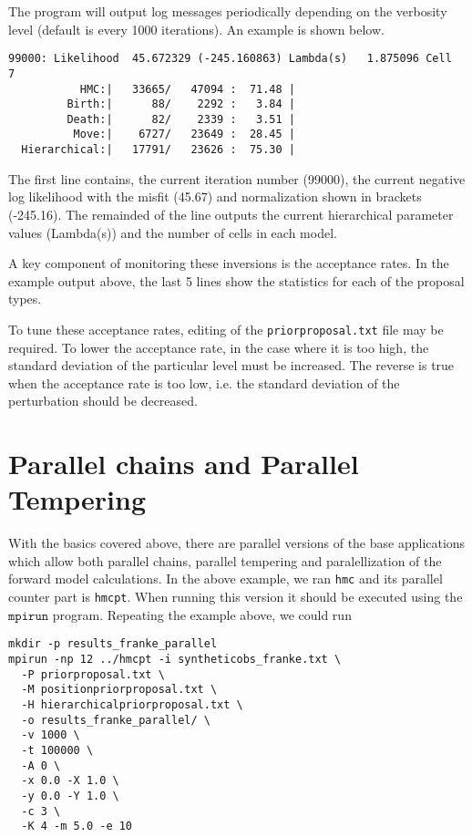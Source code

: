 \documentclass[a4paper,12pt]{article}
\begin{document}
The program will output log messages periodically depending on the
verbosity level (default is every 1000 iterations). An example
is shown below.

{
  \tiny
\begin{verbatim}
99000: Likelihood  45.672329 (-245.160863) Lambda(s)   1.875096 Cell   7 
           HMC:|   33665/   47094 :  71.48 |
         Birth:|      88/    2292 :   3.84 |
         Death:|      82/    2339 :   3.51 |
          Move:|    6727/   23649 :  28.45 |
  Hierarchical:|   17791/   23626 :  75.30 |
\end{verbatim}
}

The first line contains, the current iteration number (99000), the current
negative log likelihood with the misfit (45.67) and normalization shown
in brackets (-245.16). The remainded of the line outputs the current hierarchical
parameter values (Lambda(s)) and the number of cells in each model.

A key component of monitoring these inversions is the acceptance
rates. In the example output above, the last 5 lines show the statistics
for each of the proposal types. 

To tune these acceptance rates, editing of the {\tt priorproposal.txt}
file may be required. To lower the acceptance rate, in the case where it is too
high, the standard deviation of the particular level must be increased. The
reverse is true when the acceptance rate is too low, i.e. the standard deviation
of the perturbation should be decreased.

\section{Parallel chains and Parallel Tempering}

With the basics covered above, there are parallel versions of the base
applications which allow both parallel chains, parallel tempering and
paralellization of the forward model calculations. In the above
example, we ran \texttt{hmc} and its parallel counter part is
\texttt{hmcpt}. When running this version it should be executed using
the $\texttt{mpirun}$ program. Repeating the example above, we could
run

\begin{verbatim}
mkdir -p results_franke_parallel
mpirun -np 12 ../hmcpt -i syntheticobs_franke.txt \
  -P priorproposal.txt \
  -M positionpriorproposal.txt \
  -H hierarchicalpriorproposal.txt \
  -o results_franke_parallel/ \
  -v 1000 \
  -t 100000 \
  -A 0 \
  -x 0.0 -X 1.0 \
  -y 0.0 -Y 1.0 \
  -c 3 \
  -K 4 -m 5.0 -e 10
\end{verbatim}
\end{document}
